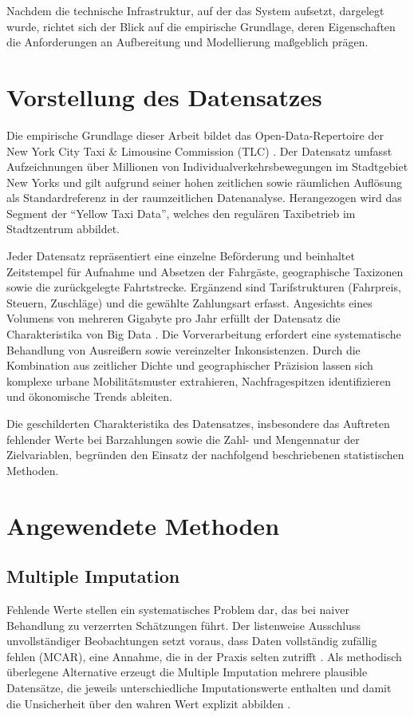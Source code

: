 Nachdem die technische Infrastruktur, auf der das System aufsetzt, dargelegt wurde, richtet sich der Blick auf die empirische Grundlage, deren Eigenschaften die Anforderungen an Aufbereitung und Modellierung maßgeblich prägen.

\section{Vorstellung des Datensatzes}
Die empirische Grundlage dieser Arbeit bildet das Open-Data-Repertoire der New York City Taxi \& Limousine Commission (TLC) \parencite[vgl.]{NYCTLC.2024}. Der Datensatz umfasst Aufzeichnungen über Millionen von Individualverkehrsbewegungen im Stadtgebiet New Yorks und gilt aufgrund seiner hohen zeitlichen sowie räumlichen Auflösung als Standardreferenz in der raumzeitlichen Datenanalyse. Herangezogen wird das Segment der \enquote{Yellow Taxi Data}, welches den regulären Taxibetrieb im Stadtzentrum abbildet.

Jeder Datensatz repräsentiert eine einzelne Beförderung und beinhaltet Zeitstempel für Aufnahme und Absetzen der Fahrgäste, geographische Taxizonen sowie die zurückgelegte Fahrtstrecke. Ergänzend sind Tarifstrukturen (Fahrpreis, Steuern, Zuschläge) und die gewählte Zahlungsart erfasst. Angesichts eines Volumens von mehreren Gigabyte pro Jahr erfüllt der Datensatz die Charakteristika von Big Data \parencite[vgl.][S.~3~ff.]{Fasel.2016}. Die Vorverarbeitung erfordert eine systematische Behandlung von Ausreißern sowie vereinzelter Inkonsistenzen. Durch die Kombination aus zeitlicher Dichte und geographischer Präzision lassen sich komplexe urbane Mobilitätsmuster extrahieren, Nachfragespitzen identifizieren und ökonomische Trends ableiten.

Die geschilderten Charakteristika des Datensatzes, insbesondere das Auftreten fehlender Werte bei Barzahlungen sowie die Zahl- und Mengennatur der Zielvariablen, begründen den Einsatz der nachfolgend beschriebenen statistischen Methoden.

\section{Angewendete Methoden}
\subsection{Multiple Imputation}
\label{sec:mice}
Fehlende Werte stellen ein systematisches Problem dar, das bei naiver Behandlung zu verzerrten Schätzungen führt. Der listenweise Ausschluss unvollständiger Beobachtungen setzt voraus, dass Daten vollständig zufällig fehlen (MCAR), eine Annahme, die in der Praxis selten zutrifft \parencite[vgl.][S.~15~ff.]{vanBuuren.2011}. Als methodisch überlegene Alternative erzeugt die Multiple Imputation mehrere plausible Datensätze, die jeweils unterschiedliche Imputationswerte enthalten und damit die Unsicherheit über den wahren Wert explizit abbilden \parencite[vgl.][S.~4~ff.]{vanBuuren.2011}.

